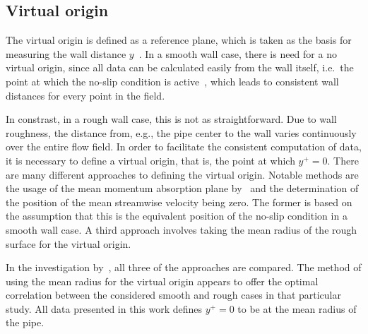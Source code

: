 \subsection{Virtual origin}\label{subsec: Virtual origin}

The virtual origin is defined as a reference plane, which is taken as the basis for measuring the wall distance $y$~\citep{chungPredictingDragRough2021}.
In a smooth wall case, there is need for a no virtual origin, since all data can be calculated easily from the wall itself, i.e.\ the point at which the no-slip condition is active~\citep{chanSystematicInvestigationRoughness2015}, which leads to consistent wall distances for every point in the field.

In constrast, in a rough wall case, this is not as straightforward.
Due to wall roughness, the distance from, e.g., the pipe center to the wall varies continuously over the entire flow field.
In order to facilitate the consistent computation of  data, 
 it is necessary to define a virtual origin, that is, the point  at which $y^+ = 0$.
There are many different approaches to defining the virtual origin.
Notable methods are the usage of the mean momentum absorption plane by~\cite{thomMomentumAbsorptionVegetation1971} and the determination of the position of the mean streamwise velocity being zero. The former is based on the assumption  that this is the equivalent position of the no-slip condition in a smooth wall case.
A third approach  involves taking  the mean radius of the rough surface for the virtual origin.



In the investigation by~\cite{chanSystematicInvestigationRoughness2015}, all three of the approaches are compared. 
The method of using the mean radius for the virtual origin appears to offer the optimal correlation between the considered smooth and rough cases in that particular study.
All data presented in this work defines $y^+ = 0$ to be at the mean radius of the pipe.


